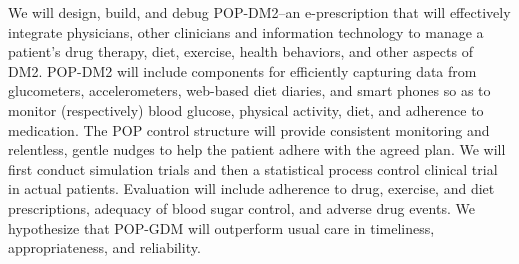 \documentclass[11pt]{article}
\begin{document}
 We will design, build, and debug POP-DM2--an e-prescription that will
 effectively integrate physicians, other clinicians and information
 technology to manage a patient's drug therapy, diet, exercise, health
 behaviors, and other aspects of DM2. POP-DM2 will include components
 for efficiently capturing data from glucometers, accelerometers,
 web-based diet diaries, and smart phones so as to monitor
 (respectively) blood glucose, physical activity, diet, and adherence
 to medication. The POP control structure will provide consistent
 monitoring and relentless, gentle nudges to help the patient adhere
 with the agreed plan. We will first conduct simulation trials and
 then a statistical process control clinical trial in actual
 patients. Evaluation will include adherence to drug, exercise, and
 diet prescriptions, adequacy of blood sugar control, and adverse drug
 events. We hypothesize that POP-GDM will outperform usual care in
 timeliness, appropriateness, and reliability.

\newpage



\end{document}
